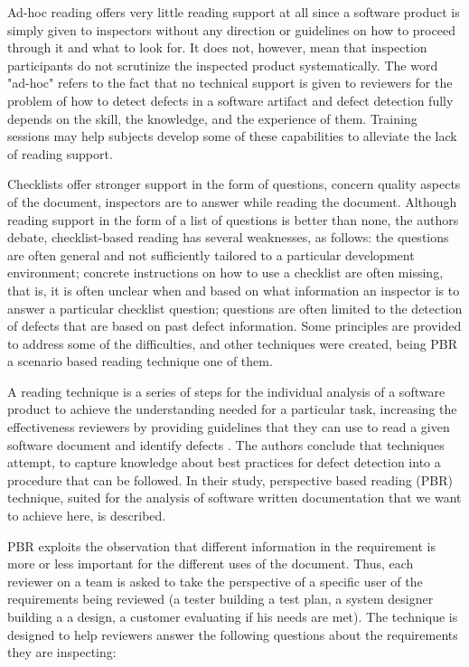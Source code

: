 Ad-hoc reading offers very little reading support at all since a software product is simply given to inspectors without any direction or guidelines on how to proceed through it and what to look for. It does not, however, mean that inspection participants do not scrutinize the inspected product systematically. The word "ad-hoc" refers to the fact that no technical support is given to reviewers for the problem of how to detect defects in a software artifact and defect detection fully depends on the skill, the knowledge, and the experience of them. Training sessions may help subjects develop some of these capabilities to alleviate the lack of reading support.

Checklists offer stronger support in the form of questions, concern quality aspects of the document, inspectors are to answer while reading the document. Although reading support in the form of a list of questions is better than none, the authors debate, checklist-based reading has several weaknesses, as follows: the questions are often general and not sufficiently tailored to a particular development environment; concrete instructions on how to use a checklist are often missing, that is, it is often unclear when and based on what information an inspector is to answer a particular checklist question; questions are often limited to the detection of defects that are based on past defect information. Some principles are provided  to address some of the difficulties, and other techniques were created, being PBR a scenario based reading technique one of them.

A reading technique is a series of steps for the individual analysis of a software product to achieve the understanding needed for a particular task, increasing the effectiveness reviewers by providing guidelines that they can use to read a given software document and identify defects \cite{Melo_2001}. The authors conclude that techniques attempt, to capture knowledge about best practices for defect detection into a procedure that can be followed. In their study, perspective based reading (PBR) technique, suited for the analysis of software written documentation that we want to achieve here, is described.

PBR exploits the observation that different information in the requirement is more or less important for the different uses of the document. Thus, each reviewer on a team is asked to take the perspective of a specific user of the requirements being reviewed (a tester building a test plan, a system designer building a a design, a customer evaluating if his needs are met). The technique is designed to help reviewers answer the following questions about the requirements they are inspecting:

